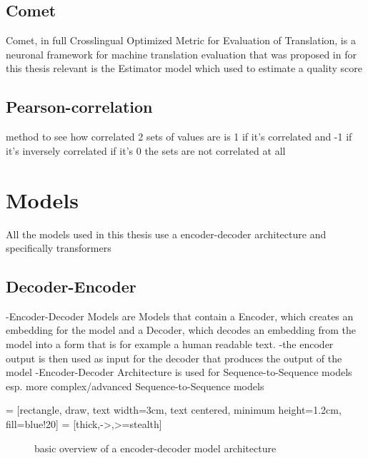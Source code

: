 \subsection{Comet}
Comet, in full Crosslingual Optimized Metric for Evaluation of Translation, is a neuronal framework for machine translation evaluation that was proposed in \cite{rei-etal-2020-comet} 
for this thesis relevant is the Estimator model which used to estimate a quality score 

\subsection{Pearson-correlation}
method to see how correlated 2 sets of values are
is 1 if it's correlated and -1 if it's inversely correlated 
if it's 0 the sets are not correlated at all

\section{Models}
All the models used in this thesis use a encoder-decoder architecture and specifically transformers
\subsection{Decoder-Encoder}
-Encoder-Decoder Models are Models that contain a Encoder, which creates an embedding for the model
and a Decoder, which decodes an embedding from the model into a form that is for example a human readable text. 
-the encoder output is then used as input for the decoder that produces the output of the model 
-Encoder-Decoder Architecture is used for Sequence-to-Sequence models esp. more complex/advanced Sequence-to-Sequence models 

 = [rectangle, draw, text width=3cm, text centered, minimum height=1.2cm, fill=blue!20]
 = [thick,->,>=stealth]
\begin{figure}
    \centering
{}
\label{fig:encoder-decoder model}
\caption{basic overview of a encoder-decoder model architecture}
\end{figure}

